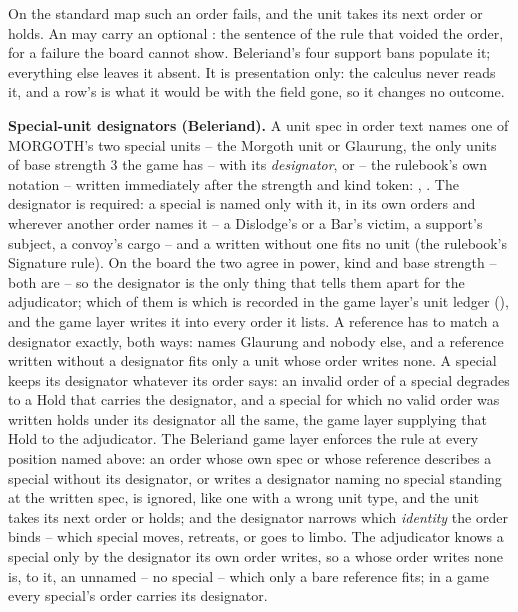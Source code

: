 \documentclass[12pt,a4paper]{article}
\begin{document}
On the standard map such an order fails, and the unit takes its next order or holds.
An  may carry an optional : the sentence of the rule that voided the order, for a failure the board cannot show.
Beleriand's four support bans populate it; everything else leaves it absent.
It is presentation only: the calculus never reads it, and a row's  is what it would be with the field gone, so it changes no outcome.

\textbf{Special-unit designators (Beleriand).}
A unit spec in order text names one of MORGOTH's two special units -- the Morgoth unit or Glaurung, the only units of base strength 3 the game has -- with its \emph{designator},  or  -- the rulebook's own notation -- written immediately after the strength and kind token: , .
The designator is required: a special is named only with it, in its own orders and wherever another order names it -- a Dislodge's or a Bar's victim, a support's subject, a convoy's cargo -- and a  written without one fits no unit (the rulebook's Signature rule).
On the board the two agree in power, kind and base strength -- both are  -- so the designator is the only thing that tells them apart for the adjudicator; which of them is which is recorded in the game layer's unit ledger (), and the game layer writes it into every order it lists.
A reference has to match a designator exactly, both ways:  names Glaurung and nobody else, and a reference written without a designator fits only a unit whose order writes none.
A special keeps its designator whatever its order says: an invalid order of a special degrades to a Hold that carries the designator, and a special for which no valid order was written holds under its designator all the same, the game layer supplying that Hold to the adjudicator.
The Beleriand game layer enforces the rule at every position named above: an order whose own spec or whose reference describes a special without its designator, or writes a designator naming no special standing at the written spec, is ignored, like one with a wrong unit type, and the unit takes its next order or holds; and the designator narrows which \emph{identity} the order binds -- which special moves, retreats, or goes to limbo.
The adjudicator knows a special only by the designator its own order writes, so a  whose order writes none is, to it, an unnamed  -- no special -- which only a bare reference fits; in a game every special's order carries its designator.
\end{document}
